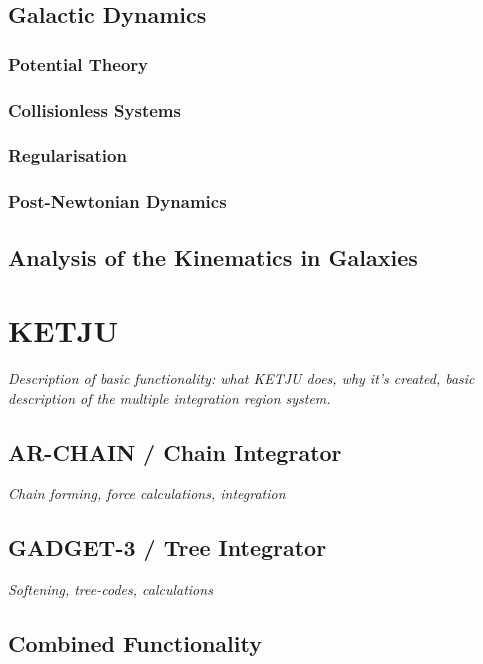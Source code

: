\documentclass[english, oneside]{HYgradu}
\begin{document}
\section{Galactic Dynamics}

\subsection{Potential Theory}

\subsection{Collisionless Systems}

\subsection{Regularisation}

\subsection{Post-Newtonian Dynamics}

\section{Analysis of the Kinematics in Galaxies}

\chapter{KETJU}

\textit{Description of basic functionality: what KETJU does, why it's created, basic description of the multiple integration region system.} 

\section{AR-CHAIN / Chain Integrator}

\textit{Chain forming, force calculations, integration}

\section{GADGET-3 / Tree Integrator}

\textit{Softening, tree-codes, calculations}

\section{Combined Functionality}
\end{document}
